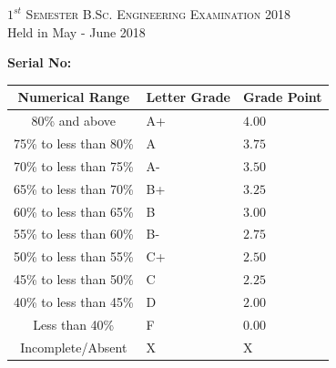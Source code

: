 \documentclass[11pt]{article}
\begin{document}
\begin{table}[ht]
\begin{minipage}[b]{0.35\textwidth}
                \smallskip
                \textsc{$1^{st}$ Semester B.Sc. Engineering Examination 2018}\\
                {Held in May  - June 2018}\\
                \end{minipage}
                \hspace{0.2cm}
                \begin{minipage}[m]{0.3\linewidth} \flushright
                \vspace*{-1.5in}  
                {\flushright \bf	Serial No:\sl \\}
                \vspace{4mm}
                \begin{small}
                \renewcommand{\arraystretch}{1.01}
                \begin{tabular}{ |c|>{\centering}m{0.9cm}|m{0.91cm}|} 
                    \hline {\bf Numerical Range} & {\bf Letter Grade} & {\bf Grade Point} \\
                \hline   80\% and above & A+ & $4.00$  \\ 
                \hline   75\% to less than 80\% &  A & $3.75$\\ 
                \hline   70\% to less than 75\% &  A- & $3.50$ \\ 
                \hline   65\% to less than 70\% &  B+ & $3.25$\\ 
                \hline   60\% to less than 65\% &  B  & $3.00$\\ 
                \hline   55\% to less than 60\% &  B- & $2.75$\\ 
                \hline   50\% to less than 55\% &  C+ & $2.50$\\ 
                \hline   45\% to less than 50\% &  C  & $2.25$\\
                \hline   40\% to less than 45\% &  D  & $2.00$\\
                \hline   Less than 40\%         &  F  & $0.00$\\ 
                \hline   Incomplete/Absent         &  X  & X\\ 
                \hline 
                
                \end{tabular}
                \end{small} 
                \end{minipage}
                \end{table}
                \vspace*{-0.5cm}
\end{document}
